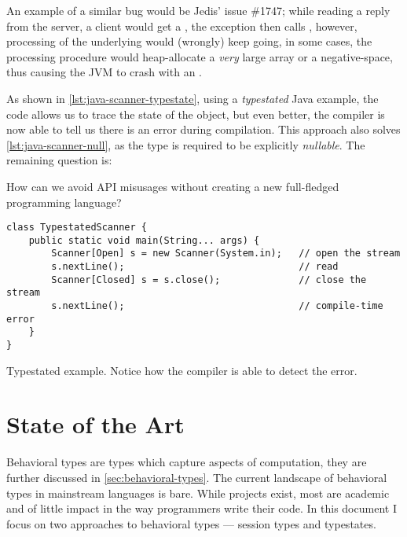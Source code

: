 An example of a similar bug would be Jedis' issue \#1747;
while reading a reply from the server, a client would get a ,
the exception then calls , however, processing of the underlying would (wrongly) keep going,
in some cases, the processing procedure would heap-allocate a \emph{very} large array or a negative-space,
thus causing the \gls{JVM} to crash with an .


As shown in \autoref{lst:java-scanner-typestate}, using a \emph{typestated} Java example,
the code allows us to trace the state of the object, but even better,
the compiler is now able to tell us there is an error during compilation.
This approach also solves \autoref{lst:java-scanner-null}, as the type is required to be explicitly \emph{nullable}.
The remaining question is:
\begin{displayquote}
    How can we avoid \gls{API} misusages without creating a new full-fledged programming language?
\end{displayquote}

\begin{listing}
    \begin{verbatim}
class TypestatedScanner {
    public static void main(String... args) {
        Scanner[Open] s = new Scanner(System.in);   // open the stream
        s.nextLine();                               // read
        Scanner[Closed] s = s.close();              // close the stream
        s.nextLine();                               // compile-time error
    }
}
    \end{verbatim}
    \caption{
        Typestated  example.
        Notice how the compiler is able to detect the error.
    }
    \label{lst:java-scanner-typestate}
\end{listing}

\section{State of the Art}\label{sec:state-of-the-art}

Behavioral types are types which capture aspects of computation, they are further discussed in \autoref{sec:behavioral-types}.
The current landscape of behavioral types in mainstream languages is bare.
While projects exist, most are academic and of little impact in the way programmers write their code.
In this document I focus on two approaches to behavioral types --- session types and typestates.

